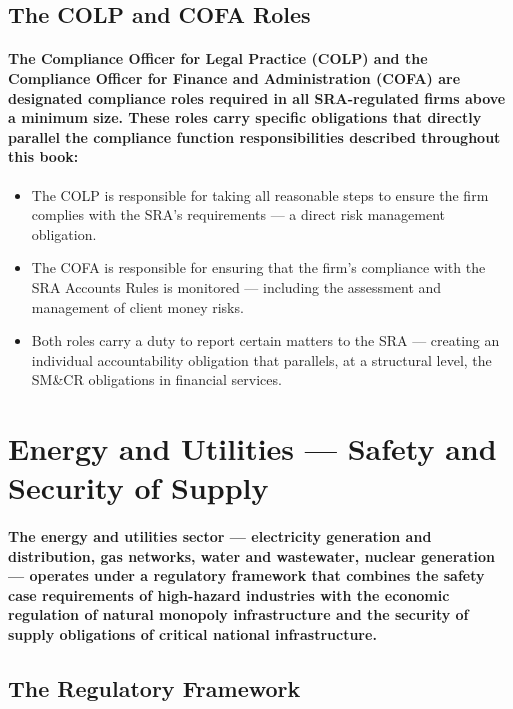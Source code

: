 \subsection{The COLP and COFA Roles}
\paragraph{The \textbf{Compliance Officer for Legal Practice (COLP)} and the \textbf{Compliance Officer for Finance and Administration (COFA)} are designated compliance roles required in all SRA-regulated firms above a minimum size. These roles carry specific obligations that directly parallel the compliance function responsibilities described throughout this book:}
\begin{itemize}
  \item{The COLP is responsible for taking all reasonable steps to ensure the firm complies with the SRA's requirements — a direct risk management obligation.}
  \item{The COFA is responsible for ensuring that the firm's compliance with the SRA Accounts Rules is monitored — including the assessment and management of client money risks.}
  \item{Both roles carry a duty to report certain matters to the SRA — creating an individual accountability obligation that parallels, at a structural level, the SM\&CR obligations in financial services.}
\end{itemize}

\section{Energy and Utilities — Safety and Security of Supply}
\paragraph{The energy and utilities sector — electricity generation and distribution, gas networks, water and wastewater, nuclear generation — operates under a regulatory framework that combines the safety case requirements of high-hazard industries with the economic regulation of natural monopoly infrastructure and the security of supply obligations of critical national infrastructure.}

\subsection{The Regulatory Framework}
